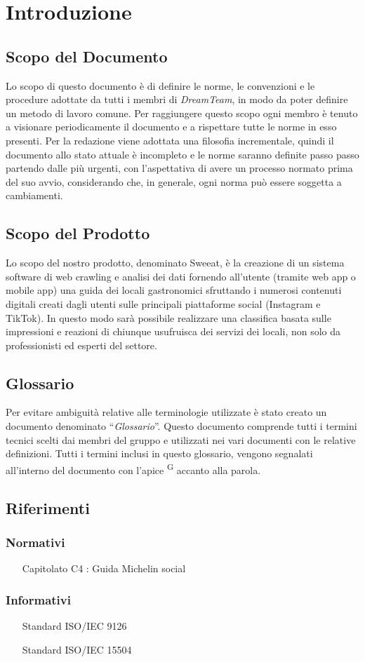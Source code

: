 \section{Introduzione}

\subsection{Scopo del Documento}
Lo scopo di questo documento è di definire le norme, le convenzioni e le procedure adottate da tutti i membri di \textit{DreamTeam}, in modo da poter definire un metodo di lavoro comune.
Per raggiungere questo scopo ogni membro è tenuto a visionare periodicamente il documento e a rispettare tutte le norme in esso presenti. 
Per la redazione viene adottata una filosofia incrementale, quindi il documento allo stato attuale è incompleto e le norme saranno definite passo passo partendo dalle più urgenti, con l'aspettativa di avere un processo normato prima del suo avvio, considerando che, in generale, ogni norma può essere soggetta a cambiamenti.


\subsection{Scopo del Prodotto}
Lo scopo del nostro prodotto, denominato Sweeat, è la creazione di un sistema software di web crawling e analisi dei dati fornendo all'utente (tramite web app o mobile app) una guida dei locali gastronomici sfruttando i numerosi contenuti digitali creati dagli utenti sulle principali piattaforme social (Instagram e TikTok). In questo modo sarà possibile realizzare una classifica basata sulle impressioni e reazioni di chiunque usufruisca dei servizi dei locali, non solo da professionisti ed esperti del settore.

\subsection{Glossario}
Per evitare ambiguità relative alle terminologie utilizzate è stato creato un documento denominato “\textit{Glossario}”. Questo documento comprende tutti i termini tecnici scelti dai membri del gruppo e utilizzati nei vari documenti con le relative definizioni. Tutti i termini inclusi in questo glossario, vengono segnalati all’interno del documento con l’apice \textsuperscript{G} accanto alla parola.

\subsection{Riferimenti}
\subsubsection{Normativi}
\begin{itemize}
\item [Capitolato C4 : Guida Michelin social]
\end{itemize}

\subsubsection{Informativi}
\begin{itemize}
\item [Standard ISO/IEC 9126] 

\item [Standard ISO/IEC 15504] 

\end{itemize}

